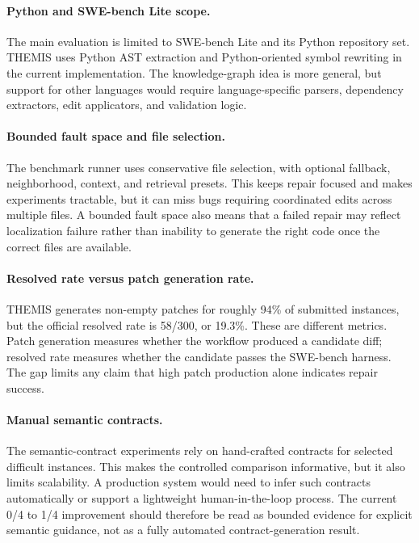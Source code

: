 \documentclass[11pt]{article}
\begin{document}
\paragraph{Python and SWE-bench Lite scope.}
The main evaluation is limited to SWE-bench Lite and its Python repository set.  THEMIS uses Python AST extraction and Python-oriented symbol rewriting in the current implementation.  The knowledge-graph idea is more general, but support for other languages would require language-specific parsers, dependency extractors, edit applicators, and validation logic.

\paragraph{Bounded fault space and file selection.}
The benchmark runner uses conservative file selection, with optional fallback, neighborhood, context, and retrieval presets.  This keeps repair focused and makes experiments tractable, but it can miss bugs requiring coordinated edits across multiple files.  A bounded fault space also means that a failed repair may reflect localization failure rather than inability to generate the right code once the correct files are available.

\paragraph{Resolved rate versus patch generation rate.}
THEMIS generates non-empty patches for roughly 94\% of submitted instances, but the official resolved rate is 58/300, or 19.3\%.  These are different metrics.  Patch generation measures whether the workflow produced a candidate diff; resolved rate measures whether the candidate passes the SWE-bench harness.  The gap limits any claim that high patch production alone indicates repair success.

\paragraph{Manual semantic contracts.}
The semantic-contract experiments rely on hand-crafted contracts for selected difficult instances.  This makes the controlled comparison informative, but it also limits scalability.  A production system would need to infer such contracts automatically or support a lightweight human-in-the-loop process.  The current 0/4 to 1/4 improvement should therefore be read as bounded evidence for explicit semantic guidance, not as a fully automated contract-generation result.
\end{document}
